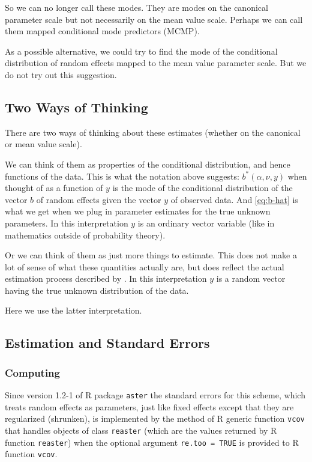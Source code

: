 \documentclass[11pt]{article}
\let\code=\texttt
\begin{document}
So we can no longer call these modes.
They are modes on the canonical parameter scale but not necessarily
on the mean value scale.
Perhaps we can call them mapped conditional mode predictors (MCMP).

As a possible alternative, we could try to find the mode of the conditional
distribution of random effects mapped to the mean value parameter scale.
But we do not try out this suggestion.

\subsection{Two Ways of Thinking}

There are two ways of thinking about these estimates (whether on the
canonical or mean value scale).

We can think of them as properties
of the conditional distribution, and hence functions of the data.
This is what the notation above suggests: $b^*(\alpha, \nu, y)$ when
thought of as a function of $y$ is the mode of the conditional distribution
of the vector $b$ of random effects given the vector $y$ of observed data.
And \eqref{eq:b-hat} is what we get when we plug in parameter estimates
for the true unknown parameters.  In this interpretation $y$ is an ordinary
vector variable (like in mathematics outside of probability theory).

Or we can think of them as just more things to estimate.  This does not
make a lot of sense of what these quantities actually are, but does reflect
the actual estimation process described by \citet{reaster}.
In this interpretation $y$ is a random vector having the true unknown
distribution of the data.

Here we use the latter interpretation.

\subsection{Estimation and Standard Errors}
\label{sec:m-estimation}

\subsubsection{Computing}
\label{sec:m-estimation-computing}

Since version 1.2-1 of R package \code{aster} \citep{aster-package}
the standard errors for this scheme, which treats random effects as
parameters, just like fixed effects except that they
are regularized (shrunken), is implemented by the method of R generic
function \code{vcov} that handles objects of class \code{reaster}
(which are the values returned by R function \code{reaster})
when the optional
argument \code{re.too = TRUE} is provided to R function \code{vcov}.
\end{document}
